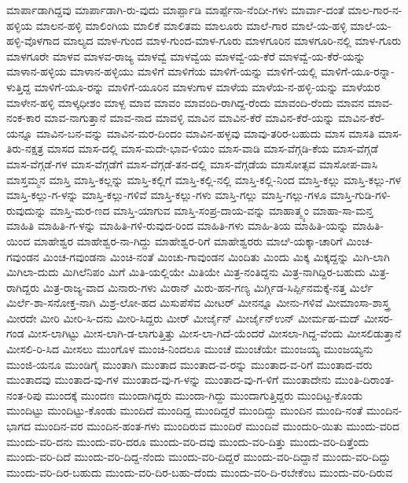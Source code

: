 ಮಾರ್ಪಾಡಾಗಿದ್ದವು
ಮಾರ್ಪಾಡಾಗಿ-ರು-ವುದು
ಮಾರ್ಪ್ಪಾಡಿ
ಮಾರ್ಪ್ಪೆನಾ-ನೆಂದೀ-ಗಳು
ಮಾರ್ವಾ-ದಂತೆ
ಮಾಲ-ಗಾರ-ನ-ಹಳ್ಳಿಯ
ಮಾಲನ-ಹಳ್ಳಿ
ಮಾಲಿಂಗಿಯ
ಮಾಲಿಕೆ
ಮಾಲಿತಮ
ಮಾಲೂರು
ಮಾಲೆ-ಗಾರ
ಮಾಲೆ-ಯ-ಹಳ್ಳಿ
ಮಾಲೆ-ಯ-ಹಳ್ಳಿ-ವೊಳಗಾದ
ಮಾಲ್ಯದ
ಮಾಳ-ಗುಂದ
ಮಾಳ-ಗುಂದ-ಮಾಳ-ಗೂರು
ಮಾಳಗೂರಿನ
ಮಾಳಗೂರಿ-ನಲ್ಲಿ
ಮಾಳ-ಗೂರು
ಮಾಳಗೂರೇ
ಮಾಳವ
ಮಾಳವ-ರಾಜ್ಯ
ಮಾಳವ್ವೆ
ಮಾಳವ್ವೆಯ
ಮಾಳವ್ವೆ-ಯ-ಕೆರೆ
ಮಾಳವ್ವೆ-ಯ-ಕೆರೆ-ಯನ್ನು
ಮಾಳಾನ-ಹಳ್ಳಿಯ
ಮಾಳಾನ-ಹಳ್ಳಿಯು
ಮಾಳಿಗೆ
ಮಾಳಿಗೆಯ
ಮಾಳಿಗೆ-ಯನ್ನು
ಮಾಳಿಗೆ-ಯಲ್ಲಿ
ಮಾಳಿಗೆ-ಯೂ-ರನ್ನಾ-ಳುತ್ತಿದ್ದ
ಮಾಳಿಗೆ-ಯೂ-ರನ್ನು
ಮಾಳಿಗೆ-ಯೂರಿನ
ಮಾಳುಗಾಳ
ಮಾಳೆಯ
ಮಾಳೆಯ-ನ-ಹಳ್ಳಿ-ಯನ್ನು
ಮಾಳೆಯರ
ಮಾಳೇನ-ಹಳ್ಳಿ
ಮಾಳ್ಕಧೀಶಂ
ಮಾಳ್ಪ
ಮಾವ
ಮಾವಂ
ಮಾವಂದಿ-ರಾಗಿದ್ದ-ರೆಂದು
ಮಾವಂದಿ-ರೆಂದು
ಮಾವನ
ಮಾವ-ನಂಕ-ಕಾರ
ಮಾವ-ನಾಗುತ್ತಾನೆ
ಮಾವ-ನಾದ
ಮಾವಳ್ಳಿ
ಮಾವಿನ
ಮಾವಿನ-ಕೆರೆ
ಮಾವಿನ-ಕೆರೆ-ಯನ್ನು
ಮಾವಿನ-ಕೆರೆ-ಯನ್ನೂ
ಮಾವಿನ-ಬನ-ವನ್ನು
ಮಾವಿನ-ಮರ-ದಿಂದಂ
ಮಾವಿನ-ಹಳ್ಳವು
ಮಾವು-ತರಿರ-ಬಹುದು
ಮಾಸ
ಮಾಸತಿ
ಮಾಸ-ತಿರು-ನಕ್ಷತ್ರ
ಮಾಸದ
ಮಾಸ-ದಲ್ಲಿ
ಮಾಸ-ಮದೇ-ಭಾವ-ಳಿಯಂ
ಮಾಸ-ವಾಡಿ
ಮಾಸ-ವೆಗ್ಗಡಿ-ಕೆಯ
ಮಾಸ-ವೆಗ್ಗಡೆ
ಮಾಸ-ವೆಗ್ಗಡೆ-ಗಳ
ಮಾಸ-ವೆಗ್ಗಡೆಗೆ
ಮಾಸ-ವೆಗ್ಗಡೆ-ತನ-ದಲ್ಲಿ
ಮಾಸ-ವೆಗ್ಗಡೆಯ
ಮಾಸೋತ್ಸವ
ಮಾಸೋಪ-ವಾಸಿ
ಮಾಸ್ತಮ್ಮನ
ಮಾಸ್ತಿ
ಮಾಸ್ತಿ-ಕಲ್ಲನ್ನು
ಮಾಸ್ತಿ-ಕಲ್ಲಿಗೆ
ಮಾಸ್ತಿ-ಕಲ್ಲಿ-ನಲ್ಲಿ
ಮಾಸ್ತಿ-ಕಲ್ಲಿ-ನಿಂದ
ಮಾಸ್ತಿ-ಕಲ್ಲು
ಮಾಸ್ತಿ-ಕಲ್ಲು-ಗಳ
ಮಾಸ್ತಿ-ಕಲ್ಲು-ಗ-ಳನ್ನು
ಮಾಸ್ತಿ-ಕಲ್ಲು-ಗಳಿವೆ
ಮಾಸ್ತಿ-ಕಲ್ಲು-ಗಳು
ಮಾಸ್ತಿ-ಗಲ್ಲು
ಮಾಸ್ತಿ-ಗಲ್ಲು-ಗಳೂ
ಮಾಸ್ತಿ-ಗುಡಿ-ಗಳಿ-ರುವುದುನ್ನು
ಮಾಸ್ತಿ-ಮರ-ಣದ
ಮಾಸ್ತಿ-ಯಾಗುವ
ಮಾಸ್ತಿ-ಸಂಪ್ರ-ದಾಯ-ವನ್ನು
ಮಾಹಾತ್ಮ್ಯಂ
ಮಾಹಾ-ಸಾ-ಮನ್ತ
ಮಾಹಿತಿ
ಮಾಹಿತಿ-ಗ-ಳನ್ನು
ಮಾಹಿತಿ-ಗಳಿ-ರುವುದ-ರಿಂದ
ಮಾಹಿತಿ-ಗಳು
ಮಾಹಿ-ತಿಯ
ಮಾಹಿತಿ-ಯನ್ನು
ಮಾಹಿತಿ-ಯಿಂದ
ಮಾಹೇಶ್ವರ
ಮಾಹೇಶ್ವರ-ನಾ-ಗಿದ್ದು
ಮಾಹೇಶ್ವರ-ರಿಗೆ
ಮಾಹೇಶ್ವರರು
ಮಾೞಿ-ಯಕ್ಕಾ-ಚಾರಿಗೆ
ಮಿಂಚ-ಗವುಂಡನ
ಮಿಂಚ-ಗವುಂಡನಾ
ಮಿಂಚಿ-ನಂತೆ
ಮಿಂಚು-ಗಾವುಂಡನ
ಮಿಂದಿತು
ಮಿಂದು
ಮಿಕ್ಕ
ಮಿಕ್ಕದ್ದನ್ನು
ಮಿಗಿ-ಲಾಗಿ
ಮಿಗಿಲಾ-ದುದು
ಮಿಗಿಲೆನಿಪಂ
ಮಿಗೆ
ಮಿತಿ-ಯಲ್ಲಿಯೇ
ಮಿತಿಯೇ
ಮಿತ್ರ-ನಂತಿದ್ದನು
ಮಿತ್ರ-ನಾಗಿದ್ದಿರ-ಬಹುದು
ಮಿತ್ರ-ರಾಗಿದ್ದರು
ಮಿತ್ರ-ರಾಜ್ಯ-ವಾದ
ಮಿನಾರು-ಗಳು
ಮಿರಾನ್
ಮಿರು-ಹನ-ಗಣ್ಯ
ಮಿರ್ಗ್ಗಿಡ-ಸಿರ್ಪ್ಪಿನಮಕ್ಕೆ-ನತ್ತ
ಮಿರ್ಲೆ
ಮಿರ್ಲೆ-ಶಾ-ಸನೋಕ್ತ-ನಾಗಿ
ಮಿಶ್ರ-ಲೋ-ಹದ
ಮಿಸುಪೆಸೆವ
ಮೀಟರ್
ಮೀನನ್ನೂ
ಮೀನು-ಗಳಿವೆ
ಮೀಮಾಂಸಾ-ಶಾಸ್ತ್ರ
ಮೀರದೇ
ಮೀರಿ
ಮೀರಿ-ಸಿ-ದನು
ಮೀರಿ-ಸಿದ್ದರು
ಮೀರ್
ಮೀರ್ಜೈನ್
ಮೀರ್ಜೈನ್ಉನ್
ಮೀರ್ಮಹ-ಮದ್
ಮೀಸರ-ಗಂಡ
ಮೀಸ-ಲಾಗಿಟ್ಟು
ಮೀಸ-ಲಾಗಿ-ಡ-ಲಾಗುತ್ತಿತ್ತು
ಮೀಸ-ಲಾ-ಗಿದೆ-ಯೆಂದರೆ
ಮೀಸಲಾ-ಗಿದ್ದ-ವೆಂದು
ಮೀಸಲಿಡುತ್ತಾನೆ
ಮೀಸಲಿ-ರಿ-ಸಿದ
ಮೀಸಲು
ಮುಂಗೊಳ
ಮುಂಚಿ-ನಿಂದಲೂ
ಮುಂಚೆ
ಮುಂಚೆಯೇ
ಮುಂಜಯ್ಯ
ಮುಂಜಯ್ಯನು
ಮುಂಜಿ-ಯನೂ
ಮುಂಡಿಗೈ
ಮುಂತಾಗಿ
ಮುಂತಾದ
ಮುಂತಾದ-ವ-ರನ್ನು
ಮುಂತಾದ-ವ-ರಿಗೆ
ಮುಂತಾದ-ವರು
ಮುಂತಾದವು
ಮುಂತಾದ-ವು-ಗಳ
ಮುಂತಾದ-ವು-ಗ-ಳನ್ನು
ಮುಂತಾದ-ವು-ಗ-ಳಿಗೆ
ಮುಂತಾದೇನು
ಮುಂತಿ-ದಿರಾಂತ-ನಂತ-ರಿಪು
ಮುಂದಕ್ಕೆ
ಮುಂದಣ
ಮುಂದಾಗಿದ್ದರು
ಮುಂದಾ-ಗಿದ್ದು
ಮುಂದಾಗುತ್ತಿದ್ದರು
ಮುಂದಿಟ್ಟ-ಕೊಂಡು
ಮುಂದಿಟ್ಟು
ಮುಂದಿಟ್ಟು-ಕೊಂಡು
ಮುಂದಿದೆ
ಮುಂದಿದ್ದ
ಮುಂದಿದ್ದರೆ
ಮುಂದಿದ್ದು
ಮುಂದಿನ
ಮುಂದಿ-ನಂತೆ
ಮುಂದಿನ-ಭಾಗದ
ಮುಂದಿನ-ವರ
ಮುಂದಿನ-ಹಂತ-ಗಳು
ಮುಂದಿರುವ
ಮುಂದಿರೆ
ಮುಂದಿವೆ
ಮುಂದುರಿ-ಯಿತು
ಮುಂದು-ವರಿದ
ಮುಂದು-ವರಿ-ದನು
ಮುಂದು-ವರಿ-ದರೂ
ಮುಂದು-ವರಿ-ದವು
ಮುಂದು-ವರಿ-ದಿತ್ತು
ಮುಂದು-ವರಿ-ದಿತ್ತೆಂದು
ಮುಂದು-ವರಿ-ದಿದೆ
ಮುಂದು-ವರಿ-ದಿದ್ದ-ನೆಂದು
ಮುಂದು-ವರಿ-ದಿದ್ದರೆ
ಮುಂದು-ವರಿ-ದಿದ್ದಾನೆ
ಮುಂದು-ವರಿ-ದಿದ್ದು
ಮುಂದು-ವರಿ-ದಿರ-ಬಹುದು
ಮುಂದು-ವರಿ-ದಿರ-ಬಹು-ದೆಂದು
ಮುಂದು-ವರಿ-ದಿ-ರಬೇಕೆಂಬ
ಮುಂದು-ವರಿ-ದಿರುವ

